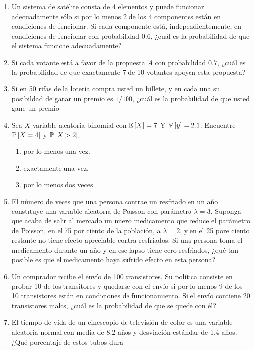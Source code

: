 \begin{Ejer}
\begin{enumerate}
\item Un sistema de satélite consta de 4 elementos y puede funcionar adecuadamente sólo si por lo menos 2 de los 4 componentes están en condiciones de funcionar. Si cada componente está, independientemente, en condiciones de funcionar con probabilidad $0.6$, ¿cuál es la probabilidad de que el sistema funcione adecuadamente?

\item Si cada votante está a favor de la propuesta $A$ con probabilidad $0.7$, ¿cuál es la probabilidad de que exactamente 7 de 10 votantes apoyen esta propuesta?

\item Si en 50 rifas de la lotería compra usted un billete, y en cada una su posibildad de ganar un premio es $1/100$, ¿cuál es la probabilidad de que usted gane un premio

\item Sea $X$ variable aleatoria binomial con $\mathbb{E}\left[X\right]=7$ Y $\mathbb{V}\left[y\right]=2.1$. Encuentre $\mathbb{P}\left[X=4\right]$ y $\mathbb{P}\left[X>2\right]$.


\begin{enumerate}
\item por lo menos una vez.
\item exactamente una vez.
\item por lo menos dos veces.
\end{enumerate}

\item El número de veces que una persona contrae un resfriado en un año constituye una variable aleatoria de Poisson con parámetro $\lambda=3$. Suponga que acaba de salir al mercado un nuevo medicamento que reduce el parámetro de Poisson, en el 75 por ciento de la población, a $\lambda=2$, y en el 25 pore ciento restante no tiene efecto apreciable contra resfriados. Si una persona toma el medicamento durante un año y en ese lapso tiene cero resfriados, ¿qué tan posible es que el medicamento haya sufrido efecto en esta persona?

\item Un comprador recibe el envío de 100 transistores. Su política consiste en probar 10 de los transitores y quedarse con el envío si por lo menos 9 de los 10 transistores están en condiciones de funcionamiento. Si el envío contiene 20 transistores malos, ¿cuál es la probabilidad de que se quede con él?

\item El tiempo de vida de un cinescopio de televisión de color es una variable aleatoria normal con media de 8.2 años y desviación estándar de 1.4 años. ¿Qué porcentaje de estos tubos dura


\end{enumerate}
\end{Ejer}
